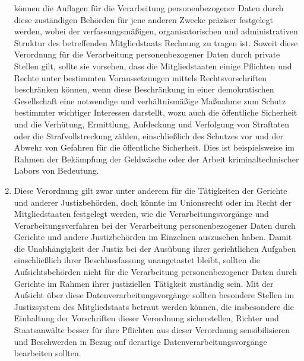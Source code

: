 \begin{enumerate}
    können die Auflagen für die Verarbeitung personenbezogener Daten durch diese zuständigen Behörden für jene anderen
    Zwecke präziser festgelegt werden, wobei der verfassungsmäßigen, organisatorischen und administrativen Struktur des
    betreffenden Mitgliedstaats Rechnung zu tragen ist. Soweit diese Verordnung für die Verarbeitung personenbezogener
    Daten durch private Stellen gilt, sollte sie vorsehen, dass die Mitgliedstaaten einige Pflichten und Rechte unter
    bestimmten Voraussetzungen mittels Rechtsvorschriften beschränken können, wenn diese Beschränkung in einer
    demokratischen Gesellschaft eine notwendige und verhältnismäßige Maßnahme zum Schutz bestimmter wichtiger
    Interessen darstellt, wozu auch die öffentliche Sicherheit und die Verhütung, Ermittlung, Aufdeckung und Verfolgung
    von Straftaten oder die Strafvollstreckung zählen, einschließlich des Schutzes vor und der Abwehr von Gefahren für
    die öffentliche Sicherheit. Dies ist beispielsweise im Rahmen der Bekämpfung der Geldwäsche oder der Arbeit
    kriminaltechnischer Labors von Bedeutung.%
   \label{eg:19}
   

   \item Diese Verordnung gilt zwar unter anderem für die Tätigkeiten der Gerichte und anderer Justizbehörden, doch
    könnte im Unionsrecht oder im Recht der Mitgliedstaaten festgelegt werden, wie die Verarbeitungsvorgänge und
    Verarbeitungsverfahren bei der Verarbeitung personenbezogener Daten durch Gerichte und andere Justizbehörden im
    Einzelnen auszusehen haben. Damit die Unabhängigkeit der Justiz bei der Ausübung ihrer gerichtlichen Aufgaben
    einschließlich ihrer Beschlussfassung unangetastet bleibt, sollten die Aufsichtsbehörden nicht für die Verarbeitung
    personenbezogener Daten durch Gerichte im Rahmen ihrer justiziellen Tätigkeit zuständig sein. Mit der Aufsicht über
    diese Datenverarbeitungsvorgänge sollten besondere Stellen im Justizsystem des Mitgliedstaats betraut werden
    können, die insbesondere die Einhaltung der Vorschriften dieser Verordnung sicherstellen, Richter und Staatsanwälte
    besser für ihre Pflichten aus dieser Verordnung sensibilisieren und Beschwerden in Bezug auf derartige
    Datenverarbeitungsvorgänge bearbeiten sollten.%
   \label{eg:20}
   


\end{enumerate}
